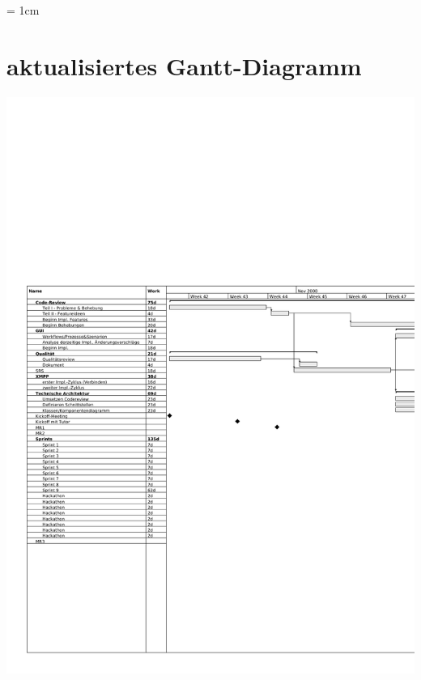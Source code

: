 

\begin{landscape}
\thispagestyle{empty}
\marginparsep = 1cm
\oddsidemargin=1cm
\voffset=2.5cm
\section{aktualisiertes Gantt-Diagramm}
\includegraphics[width=1.15\textwidth]{ase-gantt.png}
\end{landscape}
